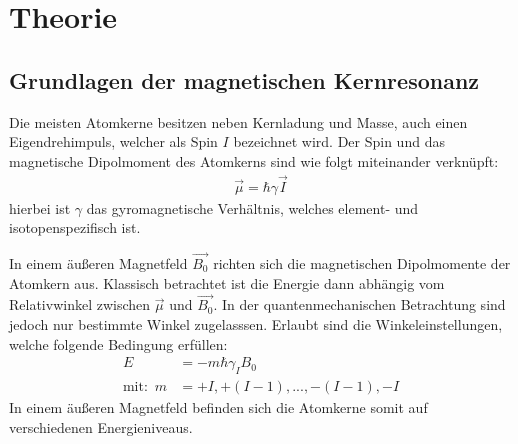 \section{Theorie}
\label{sec:Theorie}
\subsection{Grundlagen der magnetischen Kernresonanz}
\label{sec:grundlagen}
Die meisten Atomkerne besitzen neben Kernladung und Masse, auch einen Eigendrehim{\-}puls, welcher als Spin $I$ bezeichnet wird.
Der Spin und das magnetische Dipolmoment des Atomkerns sind wie folgt miteinander verkn\"{u}pft:
\begin{align*}
	\overrightarrow{\mu} = \hbar \gamma \overrightarrow{I}
\end{align*}
hierbei ist $\gamma$ das gyromagnetische Verh\"{a}ltnis, welches element- und isotopenspezifisch ist.

In einem \"{a}u{\ss}eren Magnetfeld $\overrightarrow{B_0}$ richten sich die magnetischen Dipolmomente der Atomkern aus.
Klassisch betrachtet ist die Energie dann abh\"{a}ngig vom Relativwinkel zwischen $\overrightarrow{\mu}$ und $\overrightarrow{B_0}$.
In der quantenmechanischen Betrachtung sind jedoch nur bestimmte Winkel zugelasssen.
Erlaubt sind die Winkeleinstellungen, welche folgende Bedingung erf\"{u}llen:
\begin{align}
	E &= -m \hbar \gamma_I B_0  \\
	\text{mit:} \, \, \,  m &= +I, +(I-1), ..., -(I-1), -I \nonumber
\end{align}
In einem \"{a}u{\ss}eren Magnetfeld befinden sich die Atomkerne somit auf verschiedenen Energieniveaus.

